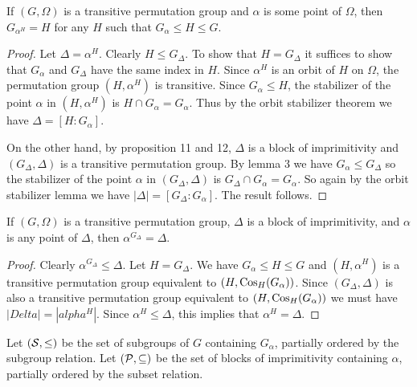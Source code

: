 \begin{lemma}
If $(G, \Omega)$ is a transitive permutation group
and $\alpha$ is some point of $\Omega$,
then $G_{\alpha^H} = H$
for any $H$ such that $G_\alpha \leq H \leq G$.
\begin{proof}
Let $\Delta = \alpha^H$.
Clearly $H \leq G_{\Delta}$.
To show that $H = G_\Delta$ it suffices to show that $G_\alpha$
and $G_\Delta$ have the same index in $H$.
Since $\alpha^H$ is an orbit of $H$ on $\Omega$,
the permutation group $(H,\alpha^H)$ is transitive.
Since $G_\alpha \leq H$, 
the stabilizer of the point $\alpha$ in $(H,\alpha^H)$
is $H \cap G_\alpha = G_\alpha$.
Thus by the orbit stabilizer theorem we have
$\Delta = [H : G_\alpha]$.

On the other hand, by proposition 11 and 12,
$\Delta$ is a block of imprimitivity
and $(G_{\Delta}, \Delta)$ is a transitive permutation group.
By lemma 3 we have $G_\alpha \leq G_\Delta$ 
so the stabilizer of the point $\alpha$ in $(G_\Delta, \Delta)$
is $G_\Delta \cap G_\alpha = G_\alpha$.
So again by the orbit stabilizer lemma we have
$|\Delta| = [G_{\Delta}: G_{\alpha}]$.
The result follows.

\end{proof}
\end{lemma}

\begin{lemma}
If $(G,\Omega)$ is a transitive permutation group,
$\Delta$ is a block of imprimitivity,
and $\alpha$ is any point of $\Delta$,
then $\alpha^{G_{\Delta}} = \Delta$.
\begin{proof}
Clearly $\alpha^{G_{\Delta}} \leq \Delta$.
Let $H = G_{\Delta}$.
We have $G_{\alpha} \leq H \leq G$
and $(H,\alpha^H)$ is a transitive permutation group
equivalent to $(H,\operatorname{Cos}_H(G_\alpha))$.
Since $(G_{\Delta}, \Delta)$ is also a transitive permutation group
equivalent to $(H, \operatorname{Cos}_H(G_\alpha))$
we must have $|Delta| = |alpha^H|$.
Since $\alpha^H \leq \Delta$, this implies that $\alpha^H = \Delta$.

\end{proof}

\end{lemma}

Let $(\mathcal{S}, \leq)$ be the set of subgroups of $G$ containing $G_\alpha$,
partially ordered by the subgroup relation.
Let $(\mathcal{P}, \subseteq)$ be the set of blocks of imprimitivity containing $\alpha$,
partially ordered by the subset relation.

